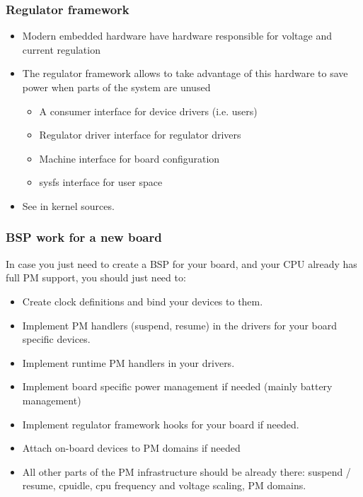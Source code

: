 \begin{frame}
  \frametitle{Regulator framework}
  \begin{itemize}
  \item Modern embedded hardware have hardware responsible for voltage
    and current regulation
  \item The regulator framework allows to take advantage of this
    hardware to save power when parts of the system are unused
    \begin{itemize}
    \item A consumer interface for device drivers (i.e. users)
    \item Regulator driver interface for regulator drivers
    \item Machine interface for board configuration
    \item sysfs interface for user space
    \end{itemize}
  \item See  in kernel sources.
  \end{itemize}
\end{frame}

\begin{frame}
  \frametitle{BSP work for a new board}
  In case you just need to create a BSP for your board, and your
  CPU already has full PM support, you should just need to:
  \begin{itemize}
  \item Create clock definitions and bind your devices to them.
  \item Implement PM handlers (suspend, resume) in the drivers for
    your board specific devices.
  \item Implement runtime PM handlers in your drivers.
  \item Implement board specific power management if needed (mainly
    battery management)
  \item Implement regulator framework hooks for your board if
    needed.
  \item Attach on-board devices to PM domains if needed
  \item All other parts of the PM infrastructure should be already
    there: suspend / resume, cpuidle, cpu frequency and voltage
    scaling, PM domains.
  \end{itemize}
\end{frame}


